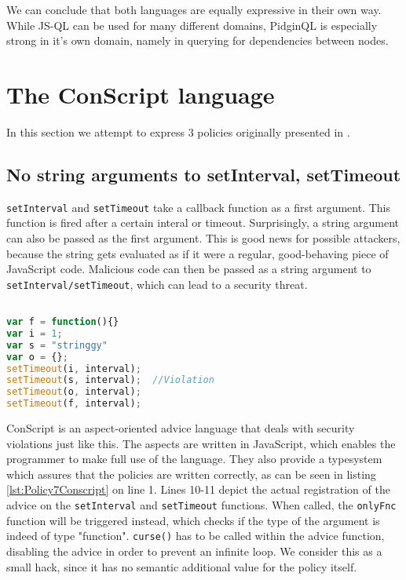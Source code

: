 We can conclude that both languages are equally expressive in their own way. While JS-QL can be used for many different domains, PidginQL is especially strong in it's own domain, namely in querying for dependencies between nodes.

\section{The ConScript language}
\label{sec:ValidationConscript}

In this section we attempt to express 3 policies originally presented in \cite{ConScript}.

\subsection{No string arguments to setInterval, setTimeout}

\texttt{setInterval} and \texttt{setTimeout} take a callback function as a first argument. This function is fired after a certain interal or timeout. Surprisingly, a string argument can also be passed as the first argument. This is good news for possible attackers, because the string gets evaluated as if it were a regular, good-behaving piece of JavaScript code. Malicious code can then be passed as a string argument to \texttt{setInterval/setTimeout}, which can lead to a security threat.


\begin{lstlisting}[label={lst:JSSetTimeout},language=JavaScript,caption=No string arguments to setTimeout,mathescape=true]  % float=t?

var f = function(){}
var i = 1;
var s = "stringgy"
var o = {};
setTimeout(i, interval);
setTimeout(s, interval);  //Violation
setTimeout(o, interval);
setTimeout(f, interval);
\end{lstlisting}

ConScript is an aspect-oriented advice language that deals with security violations just like this. The aspects are written in JavaScript, which enables the programmer to make full use of the language. They also provide a typesystem which assures that the policies are written correctly, as can be seen in listing \ref{lst:Policy7Conscript} on line 1. Lines 10-11 depict the actual registration of the advice on the \texttt{setInterval} and \texttt{setTimeout} functions. When called, the \texttt{onlyFnc} function will be triggered instead, which checks if the type of the argument is indeed of type "function". \texttt{curse()} has to be called within the advice function, disabling the advice in order to prevent an infinite loop. We consider this as a small hack, since it has no semantic additional value for the policy itself.

